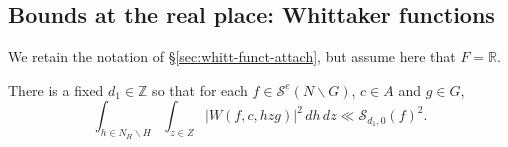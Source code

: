\subsection{Bounds at the real place: Whittaker functions}\label{sec:bounds-at-real}
We retain the notation of \S\ref{sec:whitt-funct-attach}, but assume here that $F = \mathbb{R}$.

\begin{lemma}\label{lem:integrate-by-parts-archimedean-whittaker-average-bound}
  There is a fixed $d_1 \in \mathbb{Z}$ so that for each $f \in \mathcal{S}^e(N \backslash G)$, $c \in A$ and $g \in G$,
  \begin{equation*}
    \int_{h \in N_H \backslash H}
    \int_{z \in Z}|W(f,c, h z g)|^2  \, d h \, d z \ll  \mathcal{S}_{d_1,0}(f)^2.
  \end{equation*}
\end{lemma}
